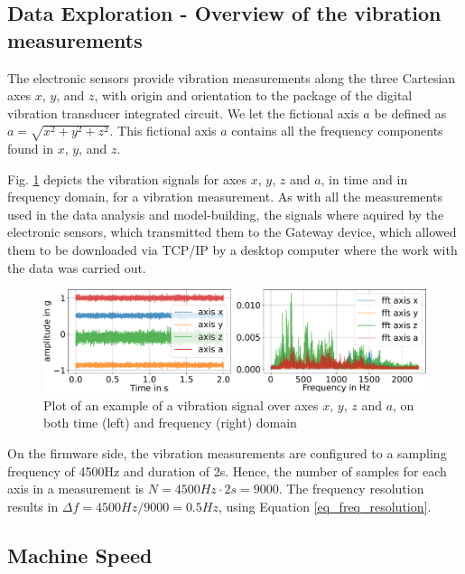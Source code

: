 \documentclass[conference]{IEEEtran}
\begin{document}
\subsection{Data Exploration - Overview of the vibration measurements}

The electronic sensors provide vibration measurements along the three Cartesian axes $x$, $y$, and $z$, with origin and orientation to the package of the digital vibration transducer integrated circuit. We let the fictional axis $a$ be defined as $a = \sqrt{x^{2}+y^{2}+z^{2}}$. This fictional axis $a$ contains all the frequency components found in $x$, $y$, and $z$. 

Fig. \ref{fig_example_signals} depicts the vibration signals for axes $x$, $y$, $z$ and $a$, in time and in frequency domain, for a vibration measurement. As with all the measurements used in the data analysis and model-building, the signals where aquired by the electronic sensors, which transmitted them to the Gateway device, which allowed them to be downloaded via TCP/IP by a desktop computer where the work with the data was carried out.



\begin{figure}[htbp]
\centering
\includegraphics[width=\columnwidth]{graphics/axes_time_fft/axes_time_fft_v2.pdf}
\caption{Plot of an example of a vibration signal over axes $x$, $y$, $z$ and $a$, on both time (left) and frequency (right) domain}
\label{fig_example_signals}
\end{figure}

On the firmware side, the vibration measurements are configured to a sampling frequency of 4500Hz and duration of 2s. Hence, the number of samples for each axis in a measurement is $N=4500Hz \cdot 2s = 9000$. The frequency resolution results in $\Delta f = 4500Hz/9000 = 0.5 Hz$, using Equation \ref{eq_freq_resolution}.

\subsection{Machine Speed}
\label{sec_machine_speed}
\end{document}

